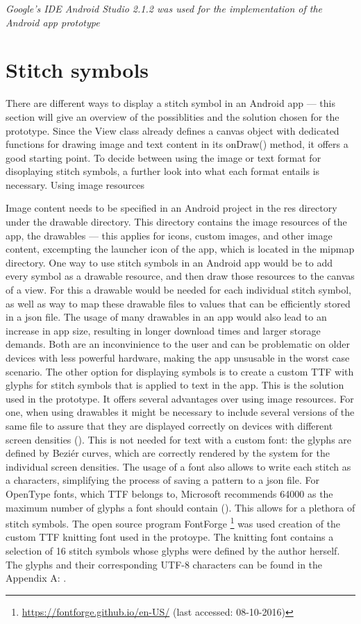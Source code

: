 \textit{Google’s IDE Android Studio 2.1.2 was used for the implementation of the Android app prototype}

\section{Stitch symbols}
There are different ways to display a stitch symbol in an Android app --- this section will give an overview of the possiblities and the solution chosen for the prototype. 
Since the View class already defines a canvas object with dedicated functions for drawing image and text content in its onDraw() method, it offers a good starting point. To decide between using the image or text format for disoplaying stitch symbols, a further look into what each format entails is necessary. Using image resources 

Image content needs to be specified in an Android project in the res directory under the drawable directory. This directory contains the image resources of the app, the drawables --- this applies for icons, custom images, and other image content, excempting the launcher icon of the app, which is located in the mipmap directory. One way to use stitch symbols in an Android app would be to add every symbol as a drawable resource, and then draw those resources to the canvas of a view. For this a drawable would be needed for each individual stitch symbol, as well as way to map these drawable files to values that can be efficiently stored in a \gls{json} file. The usage of many drawables in an app would also lead to an increase in app size, resulting in longer download times and larger storage demands. Both are an inconvinience to the user and can be problematic on older devices with less powerful hardware, making the app unsusable in the worst case scenario.
The other option for displaying symbols is to create a custom \gls{TTF} with glyphs for stitch symbols that is applied to text in the app. This is the solution used in the prototype. It offers several advantages over using image resources. For one, when using drawables it might be necessary to include several versions of the same file to assure that they are displayed correctly on devices with different screen densities (\cite{android_densities}). This is not needed for text with a custom font: the glyphs are defined by Beziér curves, which are correctly rendered by the system for the individual screen densities.  The usage of a font also allows to write each stitch as a characters, simplifying the process of saving a pattern to a \gls{json} file. For OpenType fonts, which \gls{TTF} belongs to, Microsoft recommends 64000 as the maximum number of glyphs a font should contain (\cite{microsoft_max_glyphs}). This allows for a plethora of stitch symbols. The open source program FontForge \footnote{\url{https://fontforge.github.io/en-US/} (last accessed: 08-10-2016)} was used creation of the custom \gls{TTF} knitting font used in the protoype. The knitting font contains a selection of 16 stitch symbols whose glyphs were defined by the author herself. The glyphs and their corresponding UTF-8 characters can be found in the Appendix A: .

